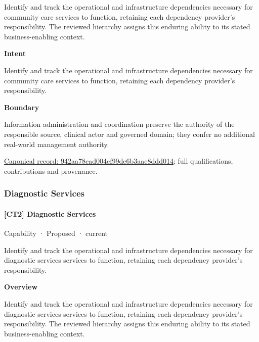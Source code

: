 Identify and track the operational and infrastructure dependencies necessary for community care services to function, retaining each dependency provider's responsibility. The reviewed hierarchy assigns this enduring ability to its stated business-enabling context.



\textbf{Intent}



Identify and track the operational and infrastructure dependencies necessary for community care services to function, retaining each dependency provider's responsibility.



\textbf{Boundary}



Information administration and coordination preserve the authority of the responsible source, clinical actor and governed domain; they confer no additional real-world management authority.


{\footnotesize \href{../../../../continuum/strategy/capability/942aa78cad004ef99de6b3aae8ddd014.md}{Canonical record: 942aa78cad004ef99de6b3aae8ddd014}; full qualifications, contributions and provenance.}\par
\subsubsection{Diagnostic Services}

\paragraph{[CT2] Diagnostic Services}

\label{element:b825ebab42f444d8b738b4c1f489f785}
{\small Capability · Proposed · current}\par

Identify and track the operational and infrastructure dependencies necessary for diagnostic services services to function, retaining each dependency provider's responsibility.



\textbf{Overview}



Identify and track the operational and infrastructure dependencies necessary for diagnostic services services to function, retaining each dependency provider's responsibility. The reviewed hierarchy assigns this enduring ability to its stated business-enabling context.



